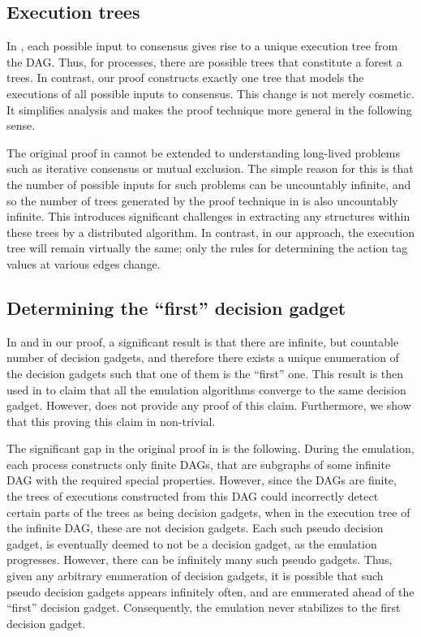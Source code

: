 \documentclass[11pt]{article}
\numberwithin{theorem}{section}
\begin{document}
\subsection{Execution trees}
In \cite{chan:twfdf}, each possible input to consensus gives rise to a unique execution tree from the DAG. Thus, for  processes, there are  possible trees that constitute a forest a trees. In contrast, our proof constructs exactly one tree that models the executions of all possible inputs to consensus. This change is not merely cosmetic. It simplifies analysis and makes the proof technique more general in the following sense.

The original proof in \cite{chan:twfdf} cannot be extended to understanding long-lived problems such as iterative consensus or mutual exclusion. The simple reason for this is that the number of possible inputs for such problems can be uncountably infinite, and so the number of trees generated by the proof technique in \cite{chan:twfdf} is also uncountably infinite. This introduces significant challenges in extracting any structures within these trees by a distributed algorithm. In contrast, in our approach, the execution tree will remain virtually the same; only the rules for determining the action tag values at various edges change.

\subsection{Determining the ``first'' decision gadget}
In \cite{chan:twfdf} and in our proof, a significant result is that there are infinite, but countable number of decision gadgets, and therefore there exists a unique enumeration of the decision gadgets such that one of them is the ``first'' one. This result is then used in \cite{chan:twfdf}  to claim that all the emulation algorithms converge to the same decision gadget. However, \cite{chan:twfdf} does not provide any proof of this claim. Furthermore, we show that this proving this claim in non-trivial.

The significant gap in the original proof in \cite{chan:twfdf} is the following. During the emulation, each process constructs only finite DAGs, that are subgraphs of some infinite DAG with the required special properties. However, since the DAGs are finite, the trees of executions constructed from this DAG could incorrectly detect certain parts of the trees as being decision gadgets, when in the execution tree of the infinite DAG, these are not decision gadgets. Each such pseudo decision gadget, is eventually deemed to not be a decision gadget, as the emulation progresses. However, there can be infinitely many such pseudo gadgets. Thus, given any arbitrary enumeration of decision gadgets, it is possible that such pseudo decision gadgets appears infinitely often, and are enumerated ahead of the ``first'' decision gadget. Consequently, the emulation never stabilizes to the first decision gadget.
\end{document}
